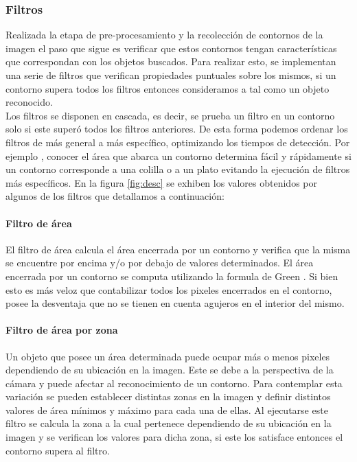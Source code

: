 	

	\subsubsection{Filtros}
	Realizada la etapa de pre-procesamiento y la recolección de contornos de la imagen el paso que sigue es verificar que estos
	contornos tengan características que correspondan con  los 
	objetos buscados. Para realizar esto, se implementan una serie de filtros que verifican propiedades
	puntuales sobre los mismos, si un contorno supera todos los filtros entonces consideramos a tal como un objeto reconocido. \\
	\indent Los filtros se disponen en cascada, es decir, se prueba un filtro en un contorno solo si este superó todos los filtros 
	anteriores. De esta forma podemos ordenar los filtros de más general a más específico, optimizando los tiempos de detección. Por ejemplo , conocer 
	el área que abarca un contorno determina fácil y rápidamente si un contorno corresponde a una colilla o a un plato evitando la ejecución
	de filtros más específicos. En la figura \ref{fig:desc} se exhiben 
	los valores obtenidos por algunos de los filtros que detallamos a 
	continuación:
	\paragraph{Filtro de área}
	El filtro de área calcula el área encerrada por un contorno y verifica que la misma se encuentre por encima y/o por debajo
	de valores determinados. El área encerrada por un contorno se computa utilizando la formula de Green \cite{greenwolfram}.
	Si bien esto es más veloz que contabilizar todos los pixeles encerrados en el contorno, posee la desventaja que no se tienen en cuenta agujeros
	en el interior del mismo.
	\paragraph{Filtro de área por zona}
	Un objeto que posee un área determinada puede ocupar más o menos pixeles dependiendo de su ubicación en la imagen. Este se debe a la 
	perspectiva de la cámara y puede afectar al reconocimiento de un contorno. Para contemplar esta variación se pueden establecer distintas
	zonas en la imagen y definir distintos valores de área mínimos y máximo para cada una de ellas. Al ejecutarse este filtro se calcula la
	zona a la cual pertenece dependiendo de su ubicación en la imagen y se verifican los valores para dicha zona, si este los satisface entonces
	el contorno supera al filtro.

